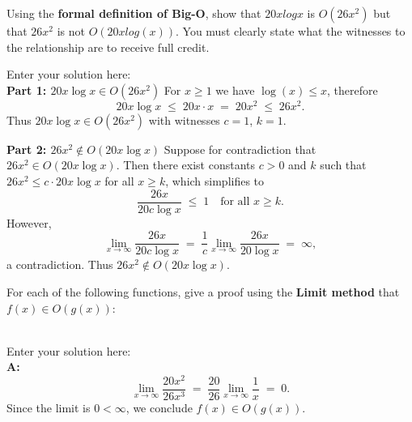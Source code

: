 \documentclass[10pt]{exam}
\begin{document}
\begin{questions}
\question[8] Using the \textbf{formal definition of Big-O}, show that $20xlogx$ is $O(26x^2)$ but that $26x^2$ is not $O(20xlog(x))$. You must clearly state what the witnesses to the relationship are to receive full credit.

\begin{solution}
    Enter your solution here:\\
    \textbf{Part 1: $20x\log x \in O(26x^2)$}
    For $x \ge 1$ we have $\log(x) \le x$, therefore
    \[20x\log x \;\le\; 20x \cdot x \;=\; 20x^2 \;\le\; 26x^2.\]
    Thus $20x\log x \in O(26x^2)$ with witnesses $c = 1$, $k = 1$.
 
    \textbf{Part 2: $26x^2 \notin O(20x\log x)$}
    Suppose for contradiction that $26x^2 \in O(20x\log x)$. Then there exist constants $c > 0$ and $k$ such that $26x^2 \le c \cdot 20x\log x$ for all $x \ge k$, which simplifies to
    \[\frac{26x}{20c\log x} \;\le\; 1 \quad\text{for all } x \ge k.\]
    However,
    \[\lim_{x \to \infty} \frac{26x}{20c\log x}
        \;=\; \frac{1}{c}\lim_{x \to \infty} \frac{26x}{20\log x}\;=\; \infty,\]
    a contradiction. Thus $26x^2 \notin O(20x\log x)$.
\end{solution}

\question[16]  For each of the following functions, give a proof using the \textbf{Limit method} that $f(x) \in O(g(x))$:

\begin{solution}\\
    Enter your solution here:\\
    \textbf{A:}
    \[\lim_{x \to \infty} \frac{20x^2}{26x^3}
        \;=\; \frac{20}{26}\lim_{x \to \infty} \frac{1}{x}\;=\; 0.\]
    Since the limit is $0 < \infty$, we conclude $f(x) \in O(g(x))$.
 

\end{solution}
\end{questions}
\end{document}
